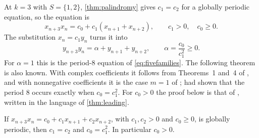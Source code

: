 At $k=3$ with $S=\{1,2\}$, \autoref{thm:palindromy} gives $c_1=c_2$ for a
globally periodic equation, so the equation is
\begin{equation}
x_{n+3}x_n=c_0+c_1(x_{n+1}+x_{n+2}),\qquad c_1>0,\quad c_0\ge0.
\label{eq:small-order3}
\end{equation}
The substitution $x_n=c_1y_n$ turns it into
\begin{equation}
y_{n+3}y_n=\alpha+y_{n+1}+y_{n+2},\qquad\alpha=\frac{c_0}{c_1^2}\ge0.
\label{eq:small-todd}
\end{equation}
For $\alpha=1$ this is the period-$8$ equation of \eqref{eq:fivefamilies}.
The following theorem is also known. With complex coefficients it follows from
Theorems~1 and~4 of \citet{CsornyeiLaczkovich2001}, and with nonnegative
coefficients it is the case $m=1$ of \citet[Theorem~4.1]{CimaGasullManosas2004};
\citet{KocicLadasRodrigues1993} had shown that the period $8$ occurs exactly
when $c_0=c_1^2$. For $c_0>0$
the proof below is that of \citet[Lemma~5(ii)]{CsornyeiLaczkovich2001}, written
in the language of \autoref{thm:leading}.

\begin{theorem}
\label{thm:order3}
If $x_{n+3}x_n=c_0+c_1x_{n+1}+c_2x_{n+2}$, with $c_1,c_2>0$ and $c_0\ge0$,
is globally periodic, then $c_1=c_2$ and $c_0=c_1^2$. In particular
$c_0>0$.
\end{theorem}

